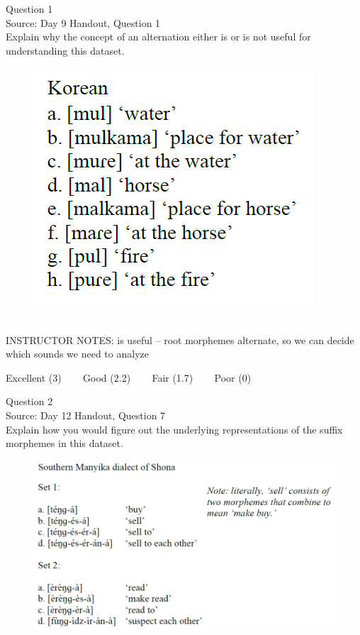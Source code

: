 \documentclass[12pt]{article}
\begin{document}
{\large Question 1}\\

Source: Day 9 Handout, Question 1\\

Explain why the concept of an alternation either is or is not useful for understanding this dataset.\\

\begin{figure}[H]
\includegraphics{../images/korean.png}
\end{figure}

~\\
INSTRUCTOR NOTES: is useful -- root morphemes alternate, so we can decide which sounds we need to analyze


\vfill
Excellent (3) ~~~ Good (2.2) ~~~ Fair (1.7) ~~~ Poor (0)
\newpage

{\large Question 2}\\

Source: Day 12 Handout, Question 7\\

Explain how you would figure out the underlying representations of the suffix morphemes in this dataset.\\

\begin{figure}[H]
\includegraphics{../images/shona.png}
\end{figure}
\end{document}
